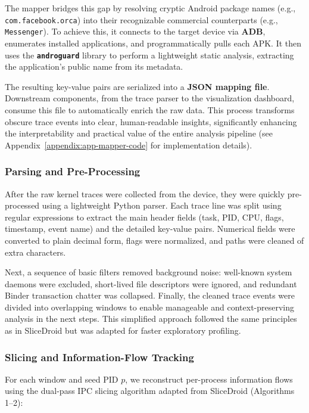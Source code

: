 \documentclass[a4paper,12pt]{report}
\begin{document}
The mapper bridges this gap by resolving cryptic Android package names (e.g., \texttt{com.facebook.orca}) into their recognizable commercial counterparts (e.g., \texttt{Messenger}). To achieve this, it connects to the target device via \textbf{ADB}, enumerates installed applications, and programmatically pulls each APK. It then uses the \textbf{\texttt{androguard}} library to perform a lightweight static analysis, extracting the application's public name from its metadata.

The resulting key-value pairs are serialized into a \textbf{JSON mapping file}. Downstream components, from the trace parser to the visualization dashboard, consume this file to automatically enrich the raw data. This process transforms obscure trace events into clear, human-readable insights, significantly enhancing the interpretability and practical value of the entire analysis pipeline (see Appendix~\ref{appendix:app-mapper-code} for implementation details).

\subsubsection{Parsing and Pre-Processing}
After the raw kernel traces were collected from the device, they were quickly pre-processed using a lightweight Python parser. Each trace line was split using regular expressions to extract the main header fields (task, PID, CPU, flags, timestamp, event name) and the detailed key-value pairs. Numerical fields were converted to plain decimal form, flags were normalized, and paths were cleaned of extra characters.

Next, a sequence of basic filters removed background noise: well-known system daemons were excluded, short-lived file descriptors were ignored, and redundant Binder transaction chatter was collapsed. Finally, the cleaned trace events were divided into overlapping windows to enable manageable and context-preserving analysis in the next steps. This simplified approach followed the same principles as in SliceDroid but was adapted for faster exploratory profiling.

\subsubsection{Slicing and Information-Flow Tracking}

For each window and seed PID $p$, we reconstruct per-process
information flows using the dual-pass IPC slicing algorithm adapted
from SliceDroid (Algorithms 1–2):
\end{document}
